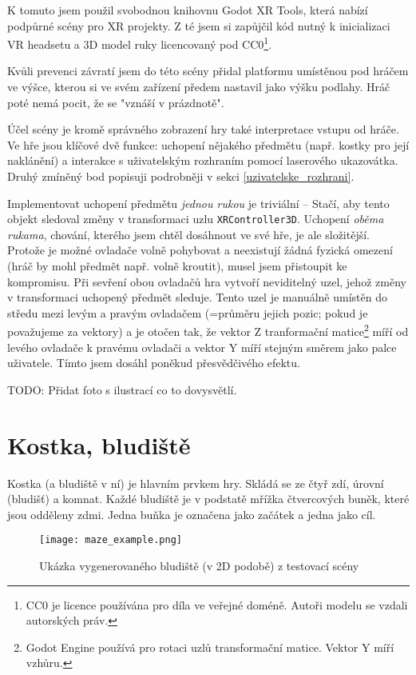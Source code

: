 K tomuto jsem použil svobodnou knihovnu Godot XR Tools, která nabízí podpůrné scény pro XR projekty. Z té jsem si zapůjčil kód nutný k inicializaci VR headsetu a 3D model ruky licencovaný pod CC0\footnote{CC0 je licence používána pro díla ve veřejné doméně. Autoři modelu se vzdali autorských práv.}.

Kvůli prevenci závratí jsem do této scény přidal platformu umístěnou pod hráčem ve výšce, kterou si ve svém zařízení předem nastavil jako výšku podlahy. Hráč poté nemá pocit, že se "vznáší v prázdnotě".

Účel scény je kromě správného zobrazení hry také interpretace vstupu od hráče. Ve hře jsou klíčové dvě funkce: uchopení nějakého předmětu (např. kostky pro její naklánění) a interakce s uživatelským rozhraním pomocí laserového ukazovátka. Druhý zmíněný bod popisuji podrobněji v sekci \ref{uzivatelske_rozhrani}.

Implementovat uchopení předmětu \textit{jednou rukou} je triviální -- Stačí, aby tento objekt sledoval změny v transformaci uzlu \texttt{XRController3D}. Uchopení \textit{oběma rukama}, chování, kterého jsem chtěl dosáhnout ve své hře, je ale složitější. Protože je možné ovladače volně pohybovat a neexistují žádná fyzická omezení (hráč by mohl předmět např. volně kroutit), musel jsem přistoupit ke kompromisu. Při sevření obou ovladačů hra vytvoří neviditelný uzel, jehož změny v transformaci uchopený předmět sleduje. Tento uzel je manuálně umístěn do středu mezi levým a pravým ovladačem (=průměru jejich pozic; pokud je považujeme za vektory) a je otočen tak, že vektor Z tranformační matice\footnote{Godot Engine používá pro rotaci uzlů transformační matice. Vektor Y míří vzhůru.} míří od levého ovladače k pravému ovladači a vektor Y míří stejným směrem jako palce uživatele. Tímto jsem dosáhl poněkud přesvědčivého efektu.

TODO: Přidat foto s ilustrací co to dovysvětlí.

\section{Kostka, bludiště}

Kostka (a bludiště v ní) je hlavním prvkem hry. Skládá se ze čtyř zdí, úrovní (bludišť) a komnat. Každé bludiště je v podstatě mřížka čtvercových buněk, které jsou odděleny zdmi. Jedna buňka je označena jako začátek a jedna jako cíl.

\begin{figure}[H]
  \centering
  \texttt{[image: maze\_example.png]}
  \caption{Ukázka vygenerovaného bludiště (v 2D podobě) z testovací scény}
  \label{maze_example}
\end{figure}


